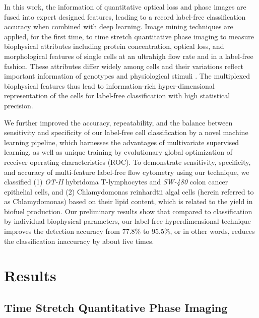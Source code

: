 \documentclass[aps,pra,reprint,superscriptaddress]{revtex4-1}
\begin{document}
In this work, the information of quantitative optical loss and phase images are fused into expert designed features, leading to a record label-free classification accuracy when combined with deep learning. Image mining techniques are applied, for the first time, to time stretch quantitative phase imaging to measure biophysical attributes including protein concentration, optical loss, and morphological features of single cells at an ultrahigh flow rate and in a label-free fashion. These attributes differ widely \cite{feinerman2008variability, sigal2006variability, friebel1999optical, vona2000isolation} among cells and their variations reflect important information of genotypes and physiological stimuli \cite{spencer2009non}. The multiplexed biophysical features thus lead to information-rich hyper-dimensional representation of the cells for label-free classification with high statistical precision. 

We further improved the accuracy, repeatability, and the balance between sensitivity and specificity of our label-free cell classification by a novel machine learning pipeline, which harnesses the advantages of multivariate supervised learning, as well as unique training by evolutionary global optimization of receiver operating characteristics (ROC). To demonstrate sensitivity, specificity, and accuracy of multi-feature label-free flow cytometry using our technique, we classified (1) \textit{OT-II} hybridoma T-lymphocytes and \textit{SW-480} colon cancer epithelial cells, and (2) Chlamydomonas reinhardtii algal cells (herein referred to as Chlamydomonas) based on their lipid content, which is related to the yield in biofuel production. Our preliminary results show that compared to classification by individual biophysical parameters, our label-free hyperdimensional technique improves the detection accuracy from 77.8\% to 95.5\%, or in other words, reduces the classification inaccuracy by about five times. 

\section*{Results}
\subsection*{Time Stretch Quantitative Phase Imaging}
\end{document}
